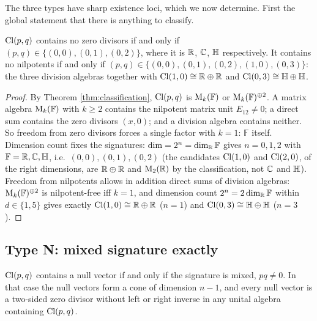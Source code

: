 The three types have sharp existence loci, which we now determine. First the global statement that there is anything to classify.

\begin{proposition}\label{prop:exceptions}
$\mathrm{Cl}(p,q)$ contains no zero divisors if and only if $(p,q) \in \{(0,0), (0,1), (0,2)\}$, where it is $\mathbb{R}$, $\mathbb{C}$, $\mathbb{H}$ respectively. It contains no nilpotents if and only if $(p,q) \in \{(0,0), (0,1), (0,2), (1,0), (0,3)\}$: the three division algebras together with $\mathrm{Cl}(1,0) \cong \mathbb{R} \oplus \mathbb{R}$ and $\mathrm{Cl}(0,3) \cong \mathbb{H} \oplus \mathbb{H}$.
\end{proposition}

\begin{proof}
By Theorem \ref{thm:classification}, $\mathrm{Cl}(p,q)$ is $\mathrm{M}_k(\mathbb{F})$ or $\mathrm{M}_k(\mathbb{F})^{\oplus 2}$. A matrix algebra $\mathrm{M}_k(\mathbb{F})$ with $k \geq 2$ contains the nilpotent matrix unit $E_{12} \neq 0$; a direct sum contains the zero divisors $(x, 0)$; and a division algebra contains neither. So freedom from zero divisors forces a single factor with $k = 1$: $\mathbb{F}$ itself. Dimension count fixes the signatures: $\dim = 2^n = \dim_{\mathbb{R}} \mathbb{F}$ gives $n = 0, 1, 2$ with $\mathbb{F} = \mathbb{R}, \mathbb{C}, \mathbb{H}$, i.e.\ $(0,0), (0,1), (0,2)$ (the candidates $\mathrm{Cl}(1,0)$ and $\mathrm{Cl}(2,0)$, of the right dimensions, are $\mathbb{R} \oplus \mathbb{R}$ and $\mathrm{M}_2(\mathbb{R})$ by the classification, not $\mathbb{C}$ and $\mathbb{H}$). Freedom from nilpotents allows in addition direct sums of division algebras: $\mathrm{M}_k(\mathbb{F})^{\oplus 2}$ is nilpotent-free iff $k = 1$, and dimension count $2^n = 2\dim_{\mathbb{R}} \mathbb{F}$ within $d \in \{1,5\}$ gives exactly $\mathrm{Cl}(1,0) \cong \mathbb{R} \oplus \mathbb{R}$ ($n=1$) and $\mathrm{Cl}(0,3) \cong \mathbb{H} \oplus \mathbb{H}$ ($n=3$).
\end{proof}

\subsection{Type N: mixed signature exactly}

\begin{proposition}\label{prop:typeNlocus}
$\mathrm{Cl}(p,q)$ contains a null vector if and only if the signature is mixed, $pq \neq 0$. In that case the null vectors form a cone of dimension $n - 1$, and every null vector is a two-sided zero divisor without left or right inverse in any unital algebra containing $\mathrm{Cl}(p,q)$.
\end{proposition}

